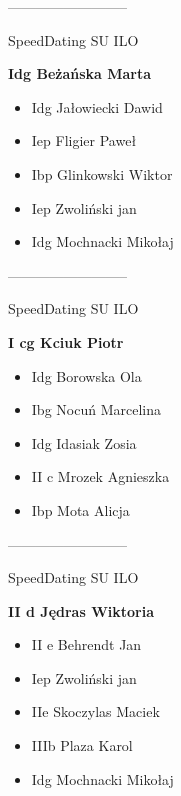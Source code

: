 \documentclass[a4paper,10pt]{article}
\begin{document}
\begin{multicols}{3}
\begin{minipage}[l]{\textwidth}
\begin{itemize}
    \end{itemize}



\end{minipage}



\begin{minipage}[l]{\textwidth}
--------------------------

  \footnotesize{SpeedDating SU ILO}

  \bfseries{Idg Beżańska Marta}

  \begin{itemize}
    \item Idg Jałowiecki Dawid
    \item Iep Fligier Paweł
    \item Ibp Glinkowski Wiktor
    \item Iep Zwoliński jan
    \item Idg Mochnacki Mikołaj

    \end{itemize}



\end{minipage}



\begin{minipage}[l]{\textwidth}
--------------------------

  \footnotesize{SpeedDating SU ILO}

  \bfseries{I cg Kciuk Piotr}

  \begin{itemize}
    \item Idg Borowska Ola
    \item Ibg Nocuń Marcelina
    \item Idg Idasiak Zosia
    \item II c Mrozek Agnieszka
    \item Ibp Mota Alicja

    \end{itemize}



\end{minipage}



\begin{minipage}[l]{\textwidth}
--------------------------

  \footnotesize{SpeedDating SU ILO}

  \bfseries{II d Jędras Wiktoria}

  \begin{itemize}
    \item II e Behrendt Jan
    \item Iep Zwoliński jan
    \item IIe Skoczylas Maciek
    \item IIIb Plaza Karol
    \item Idg Mochnacki Mikołaj


\end{itemize}
\end{minipage}
\end{multicols}
\end{document}
